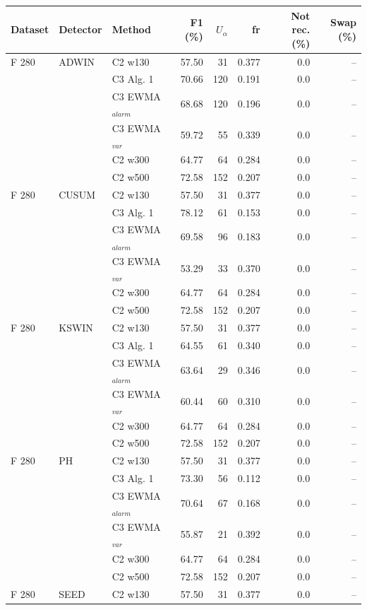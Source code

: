 \begin{longtable}{lllrrrrr}
\hline
Dataset & Detector & Method & F1 (\%) & $U_\alpha$ & fr & Not rec. (\%) & Swap (\%) \\ \hline
\endhead
F  280 & ADWIN & C2 w130 & 57.50 & 31 & 0.377 & 0.0 & -- \\
 &  & C3 Alg. 1 & 70.66 & 120 & 0.191 & 0.0 & -- \\
 &  & C3 EWMA$_{alarm}$ & 68.68 & 120 & 0.196 & 0.0 & -- \\
 &  & C3 EWMA$_{var}$ & 59.72 & 55 & 0.339 & 0.0 & -- \\
 &  & C2 w300 & 64.77 & 64 & 0.284 & 0.0 & -- \\
 &  & C2 w500 & 72.58 & 152 & 0.207 & 0.0 & -- \\
\hline
F  280 & CUSUM & C2 w130 & 57.50 & 31 & 0.377 & 0.0 & -- \\
 &  & C3 Alg. 1 & 78.12 & 61 & 0.153 & 0.0 & -- \\
 &  & C3 EWMA$_{alarm}$ & 69.58 & 96 & 0.183 & 0.0 & -- \\
 &  & C3 EWMA$_{var}$ & 53.29 & 33 & 0.370 & 0.0 & -- \\
 &  & C2 w300 & 64.77 & 64 & 0.284 & 0.0 & -- \\
 &  & C2 w500 & 72.58 & 152 & 0.207 & 0.0 & -- \\
\hline
F  280 & KSWIN & C2 w130 & 57.50 & 31 & 0.377 & 0.0 & -- \\
 &  & C3 Alg. 1 & 64.55 & 61 & 0.340 & 0.0 & -- \\
 &  & C3 EWMA$_{alarm}$ & 63.64 & 29 & 0.346 & 0.0 & -- \\
 &  & C3 EWMA$_{var}$ & 60.44 & 60 & 0.310 & 0.0 & -- \\
 &  & C2 w300 & 64.77 & 64 & 0.284 & 0.0 & -- \\
 &  & C2 w500 & 72.58 & 152 & 0.207 & 0.0 & -- \\
\hline
F  280 & PH & C2 w130 & 57.50 & 31 & 0.377 & 0.0 & -- \\
 &  & C3 Alg. 1 & 73.30 & 56 & 0.112 & 0.0 & -- \\
 &  & C3 EWMA$_{alarm}$ & 70.64 & 67 & 0.168 & 0.0 & -- \\
 &  & C3 EWMA$_{var}$ & 55.87 & 21 & 0.392 & 0.0 & -- \\
 &  & C2 w300 & 64.77 & 64 & 0.284 & 0.0 & -- \\
 &  & C2 w500 & 72.58 & 152 & 0.207 & 0.0 & -- \\
\hline
F  280 & SEED & C2 w130 & 57.50 & 31 & 0.377 & 0.0 & -- \\

\end{longtable}
